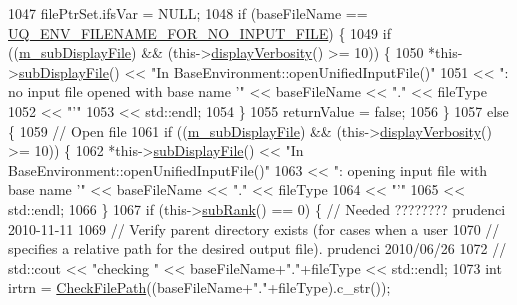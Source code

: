\begin{DoxyCode}
1047   filePtrSet.ifsVar = NULL;
1048   \textcolor{keywordflow}{if} (baseFileName == \hyperlink{_environment_options_8h_a892d0b4584a84b0dd25ce41a69493bf3}{UQ\_ENV\_FILENAME\_FOR\_NO\_INPUT\_FILE}) \{
1049     \textcolor{keywordflow}{if} ((\hyperlink{class_q_u_e_s_o_1_1_base_environment_a52b4275aa8ee85994dd304d9fe95c9c5}{m\_subDisplayFile}) && (this->\hyperlink{class_q_u_e_s_o_1_1_base_environment_a1fe5f244fc0316a0ab3e37463f108b96}{displayVerbosity}() >= 10)) \{
1050       *this->\hyperlink{class_q_u_e_s_o_1_1_base_environment_a8a0064746ae8dddfece4229b9ad374d6}{subDisplayFile}() << \textcolor{stringliteral}{"In BaseEnvironment::openUnifiedInputFile()"}
1051                               << \textcolor{stringliteral}{": no input file opened with base name '"} << baseFileName << \textcolor{stringliteral}{"."} << 
      fileType
1052                               << \textcolor{stringliteral}{"'"}
1053                               << std::endl;
1054     \}
1055     returnValue = \textcolor{keyword}{false};
1056   \}
1057   \textcolor{keywordflow}{else} \{
1059     \textcolor{comment}{// Open file}
1061 \textcolor{comment}{}    \textcolor{keywordflow}{if} ((\hyperlink{class_q_u_e_s_o_1_1_base_environment_a52b4275aa8ee85994dd304d9fe95c9c5}{m\_subDisplayFile}) && (this->\hyperlink{class_q_u_e_s_o_1_1_base_environment_a1fe5f244fc0316a0ab3e37463f108b96}{displayVerbosity}() >= 10)) \{
1062       *this->\hyperlink{class_q_u_e_s_o_1_1_base_environment_a8a0064746ae8dddfece4229b9ad374d6}{subDisplayFile}() << \textcolor{stringliteral}{"In BaseEnvironment::openUnifiedInputFile()"}
1063                               << \textcolor{stringliteral}{": opening input file with base name '"} << baseFileName << \textcolor{stringliteral}{"."} << fileType
1064                               << \textcolor{stringliteral}{"'"}
1065                               << std::endl;
1066     \}
1067     \textcolor{keywordflow}{if} (this->\hyperlink{class_q_u_e_s_o_1_1_base_environment_a172d52f993f1322ed45aaddf71518dbb}{subRank}() == 0) \{ \textcolor{comment}{// Needed ???????? prudenci 2010-11-11}
1069 \textcolor{comment}{}      \textcolor{comment}{// Verify parent directory exists (for cases when a user}
1070       \textcolor{comment}{// specifies a relative path for the desired output file). prudenci 2010/06/26}
1072 \textcolor{comment}{}      \textcolor{comment}{// std::cout << "checking " << baseFileName+"."+fileType << std::endl;}
1073       \textcolor{keywordtype}{int} irtrn = \hyperlink{namespace_q_u_e_s_o_abc55c11f68bb99c4eba88030f1164764}{CheckFilePath}((baseFileName+\textcolor{stringliteral}{"."}+fileType).c\_str());

\end{DoxyCode}
